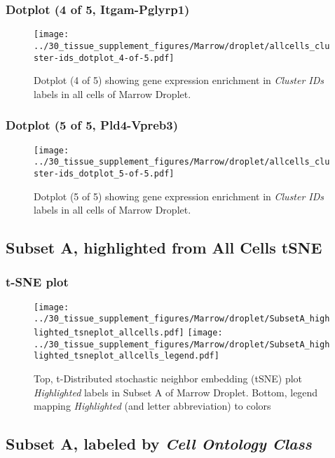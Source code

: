 \clearpage

\subsubsection{Dotplot (4 of 5, Itgam-Pglyrp1)}
\begin{figure}[h]
\centering
\texttt{[image: ../30\_tissue\_supplement\_figures/Marrow/droplet/allcells\_cluster-ids\_dotplot\_4-of-5.pdf]}

\caption{ Dotplot (4 of 5)  showing gene expression enrichment in \emph{Cluster IDs} labels in all cells of Marrow Droplet. }
\end{figure}


\clearpage

\subsubsection{Dotplot (5 of 5, Pld4-Vpreb3)}
\begin{figure}[h]
\centering
\texttt{[image: ../30\_tissue\_supplement\_figures/Marrow/droplet/allcells\_cluster-ids\_dotplot\_5-of-5.pdf]}

\caption{ Dotplot (5 of 5)  showing gene expression enrichment in \emph{Cluster IDs} labels in all cells of Marrow Droplet. }
\end{figure}


\clearpage
\subsection{Subset A, highlighted from All Cells tSNE}
\subsubsection{t-SNE plot}
\begin{figure}[h]
\centering
\texttt{[image: ../30\_tissue\_supplement\_figures/Marrow/droplet/SubsetA\_highlighted\_tsneplot\_allcells.pdf]}
\texttt{[image: ../30\_tissue\_supplement\_figures/Marrow/droplet/SubsetA\_highlighted\_tsneplot\_allcells\_legend.pdf]}
\caption{Top, t-Distributed stochastic neighbor embedding (tSNE) plot  \emph{Highlighted} labels in Subset A of Marrow Droplet. Bottom, legend mapping \emph{Highlighted} (and letter abbreviation) to colors}
\end{figure}


\clearpage

\subsection{Subset A, labeled by \emph{Cell Ontology Class}}
